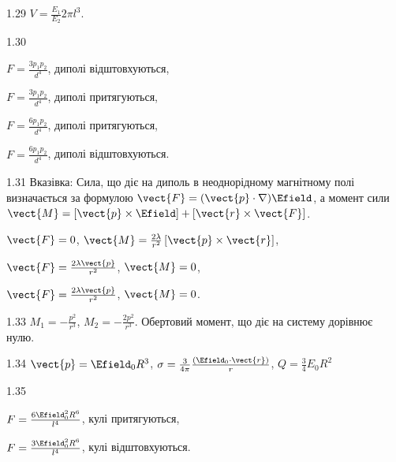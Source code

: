 \begin{Solution}{1.{29}}
	$V = \frac{E_1}{E_2}2\pi l^3$.
\end{Solution}
\begin{Solution}{1.{30}}
	\begin{enumerate*}[label=\alph*)]
		\item $F = \frac{3 p_1 p_2}{d^4}$, диполі відштовхуються,
		\item $F = \frac{3 p_1 p_2}{d^4}$, диполі притягуються,
		\item $F = \frac{6 p_1 p_2}{d^4}$, диполі притягуються,
		\item $F = \frac{6 p_1 p_2}{d^4}$, диполі відштовхуються.
	\end{enumerate*}
\end{Solution}
\begin{Solution}{1.{31}}
	Вказівка: Сила, що діє на диполь в неоднорідному магнітному полі визначається за формулою $\vect{F} = (\vect{p}\cdot\nabla)\Efield$, а момент сили $\vect{M} = \left[ \vect{p}\times\Efield\right]  + \left[ \vect{r}\times\vect{F}\right] $.

	\begin{enumerate*}[label=\alph*)]
		\item $\vect{F} = 0$, $\vect{M} = \frac{2\lambda}{r^2} \left[ \vect{p}\times\vect{r}\right] $,
		\item $\vect{F} = \frac{2\lambda \vect{p}}{r^2}$, $\vect{M} = 0$,
		\item $\vect{F} = \frac{2\lambda \vect{p}}{r^2}$, $\vect{M} = 0$.
	\end{enumerate*}
\end{Solution}
\begin{Solution}{1.{33}}
	$M_1 = -\frac{p^2}{r^3}$, $M_2 = -\frac{2p^2}{r^3}$. Обертовий момент, що діє на систему дорівнює нулю.
\end{Solution}
\begin{Solution}{1.{34}}
	$\vect{p} = \Efield_0 R^3$,
	$\sigma = \frac{3}{4\pi} \frac{\left( \Efield_0\cdot\vect{r}\right) }{r}$,
	$Q = \frac34 E_0 R^2$
\end{Solution}
\begin{Solution}{1.{35}}
	\begin{enumerate*}[label=\alph*)]
		\item $F = \frac{6\Efield_0^2R^6}{l^4}$, кулі притягуються,
		\item $F = \frac{3\Efield_0^2R^6}{l^4}$, кулі відштовхуються.
	\end{enumerate*}
\end{Solution}
